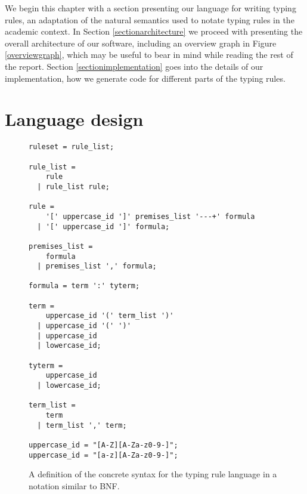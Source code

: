 \documentclass[nofilelist]{cslthse-msc}
\newcommand{\CR}[1]{\textcolor{green!60!black}{[\textbf{CR}:#1]}}
\begin{document}
We begin this chapter with a section presenting our language for writing typing rules, an adaptation of the natural semantics used to notate typing rules in the academic context.
In Section \ref{sectionarchitecture} we proceed with presenting the overall architecture of our software, including an overview graph in Figure \ref{overviewgraph}, which may be useful to bear in mind while reading the rest of the report.
Section \ref{sectionimplementation} goes into the details of our implementation, how we generate code for different parts of the typing rules.

\section{Language design}\label{sectionlanguage}
\begin{figure}[]
\begin{lstlisting}[]
ruleset = rule_list;

rule_list =
    rule
  | rule_list rule;

rule =
    '[' uppercase_id ']' premises_list '---+' formula
  | '[' uppercase_id ']' formula;

premises_list =
    formula
  | premises_list ',' formula;

formula = term ':' tyterm;

term =
    uppercase_id '(' term_list ')'
  | uppercase_id '(' ')'
  | uppercase_id
  | lowercase_id;

tyterm =
    uppercase_id
  | lowercase_id;

term_list =
    term
  | term_list ',' term;

uppercase_id = "[A-Z][A-Za-z0-9-]";
uppercase_id = "[a-z][A-Za-z0-9-]";
\end{lstlisting}
  \caption{A definition of the concrete syntax for the typing rule language in a notation similar to BNF.}
  \label{trconcretesyntaxspec}
\end{figure}
\end{document}

